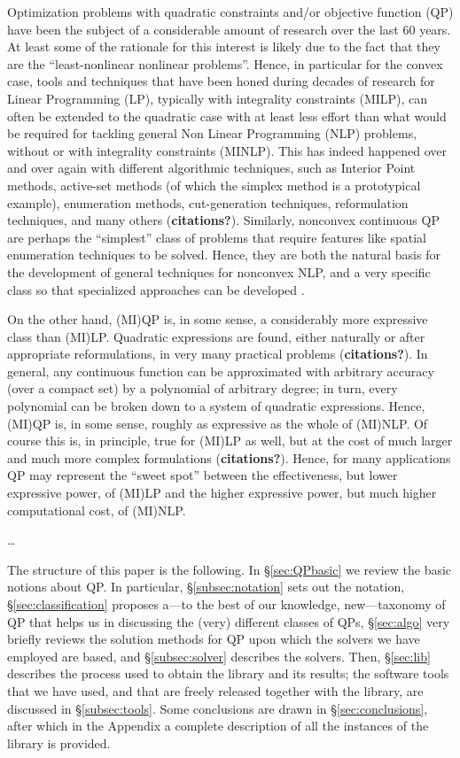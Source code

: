 Optimization problems with quadratic constraints and/or objective function (QP) have been the subject of a considerable amount of research over the last 60 years. At least some of the rationale for this interest is likely due to the fact that they are the ``least-nonlinear nonlinear problems''. Hence, in particular for the convex case, tools and techniques that have been honed during decades of research for Linear Programming (LP), typically with integrality constraints (MILP), can often be extended to the quadratic case with at least less effort than what would be required for tackling general Non Linear Programming (NLP) problems, without or with integrality constraints (MINLP). This has indeed happened over and over again with different algorithmic techniques, such as Interior Point methods, active-set methods (of which the simplex method is a prototypical example), enumeration methods, cut-generation techniques, reformulation techniques, and many others ({\bf citations?}). Similarly, nonconvex continuous QP are perhaps the ``simplest'' class of problems that require features like spatial enumeration techniques to be solved. Hence, they are both the natural basis for the development of general techniques for nonconvex NLP, and a very specific class so that specialized approaches can be developed \cite{Dur2010, Burer2012}.

On the other hand, (MI)QP is, in some sense, a considerably more expressive class than (MI)LP. Quadratic expressions are found, either naturally or after appropriate reformulations, in very many practical problems ({\bf citations?}). In general, any continuous function can be approximated with arbitrary accuracy (over a compact set) by a polynomial of arbitrary degree; in turn, every polynomial can be broken down to a system of quadratic expressions. Hence, (MI)QP is, in some sense, roughly as expressive as the whole of (MI)NLP. Of course this is, in principle, true for (MI)LP as well, but at the cost of much larger and much more complex formulations ({\bf citations?}). Hence, for many applications QP may represent the ``sweet spot'' between the effectiveness, but lower expressive power, of (MI)LP and the higher expressive power, but much higher computational cost, of (MI)NLP.

\ldots

The structure of this paper is the following. In \S \ref{sec:QPbasic} we review the basic notions about QP. In particular, \S \ref{subsec:notation} sets out the notation, \S \ref{sec:classification} proposes a---to the best of our knowledge, new---taxonomy of QP that helps us in discussing the (very) different classes of QPs, \S \ref{sec:algo} very briefly reviews the solution methods for QP upon which the solvers we have employed are based, and \S \ref{subsec:solver} describes the solvers. Then, \S \ref{sec:lib} describes the process used to obtain the library and its results; the software tools that we have used, and that are freely released together with the library, are discussed in \S \ref{subsec:tools}. Some conclusions are drawn in \S \ref{sec:conclusions}, after which in the Appendix a complete description of all the instances of the library is provided.


